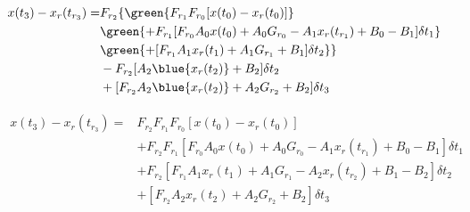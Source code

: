 \begin{align}
	\begin{split}
		x(t_3) - x_r(t_{r_3}) =  & F_{r_2} \{\green{F_{r_1}F_{r_0}[x(t_0) - x_r(t_0)]} \\
								 & \green{ + F_{r_1}[F_{r_0} A_0 x(t_0) + A_0 G_{r_0} - A_1 x_r(t_{r_1}) + B_0 - B_1] \delta t_1 } \\
								 & \green{ + [F_{r_1} A_1 x_r(t_1) + A_1 G_{r_1} + B_1 ] \delta t_2 } \} \\
							     & - F_{r_2} [A_2 \blue{x_r(t_2)} + B_2] \delta t_2 \\
							     & + [ F_{r_2} A_2 \blue{x_r(t_2)} + A_2 G_{r_2} + B_2] \delta t_3
	\end{split}
	\nonumber
\end{align}

\begin{align}
	\begin{split}
		x(t_3) - x_r(t_{r_3}) =  & F_{r_2}F_{r_1}F_{r_0} [x(t_0) - x_r(t_0)] \\
								 & + F_{r_2}F_{r_1}[F_{r_0} A_0 x(t_0) + A_0 G_{r_0} - A_1 x_r(t_{r_1}) + B_0 - B_1] \delta t_1 \\
								 & + F_{r_2}[F_{r_1} A_1 x_r(t_1) + A_1 G_{r_1} - A_2 x_r(t_{r_2}) + B_1 - B_2 ] \delta t_2 \\
							     & + [F_{r_2} A_2 x_r(t_2) + A_2 G_{r_2} + B_2] \delta t_3
	\end{split}
\end{align}